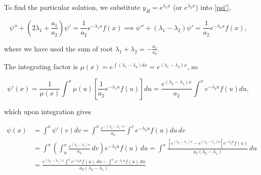\documentclass[english,a4paper,12pt]{report}
\begin{document}
\renewcommand{\arraystretch}{1.5} %

To find the particular solution, we substitute \(y_{H} = e^{\lambda _{1} x }  \) (or \(e^{ \lambda _{2}x} \)) into \cref{psi'}, 


\begin{equation}
    \psi '' + \left(2\lambda _{1} + \frac{a_1 }{a_2 } \right)  \psi ' = \frac{1}{a_2 } e^{-\lambda _{1}x }f(x) \implies \psi '' + \left(\lambda _{1}  - \lambda _{2} \right) \psi ' = \frac{1}{a_2 } e^{-\lambda _{1} x } f(x), 
\end{equation}

where we have used the sum of root \(\lambda _{1} + \lambda _{2} = -\frac{a_1 }{a_{2}}  \).

The integrating factor is \(\mu  (x) = e^{\int (\lambda _{1} - \lambda _{2}  ) dx} = e^{(\lambda _{1} - \lambda _{2}  )x}  \), so

\begin{equation}
    \psi'(x) = \frac{1}{\mu (x)} \int^x \mu (u) \left[ \frac{1}{a_2} e^{-\lambda_1 u} f(u) \right] du = \frac{e^{(\lambda_2 - \lambda_1)x}}{a_2} \int^x e^{-\lambda_2 u} f(u) du,
\end{equation}

which upon integration gives

\begin{equation}
    \begin{aligned}
    \psi(x) &= \int^x \psi'(v) dv = \int^x \frac{e^{-(\lambda_2 - \lambda_1) v}}{a_2} \int^v e^{-\lambda_2 u} f(u) du \, dv \\
    & = \int^x \left( \int^x_u \frac{e^{(\lambda_2 - \lambda_1) v}}{a_2} \, dv \right) e^{-\lambda_2 u} f(u) \, du = \int^x \frac{\left[e^{(\lambda_2 - \lambda_1) x} - e^{(\lambda_2 - \lambda_1) u}\right] e^{-\lambda_2 u} f(u)}{a_2 (\lambda_2 - \lambda_1)} \, du \\
    &= \frac{e^{(\lambda_2 - \lambda_1) x} \int^x e^{-\lambda_2 u} f(u) \, du - \int^x e^{-\lambda_1 u} f(u) \, du}{a_2 (\lambda_2 - \lambda_1)}
    \end{aligned}
\end{equation}
\end{document}
